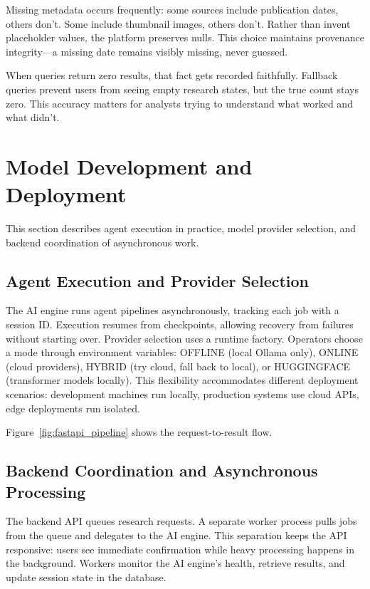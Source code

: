 \documentclass[12pt, a4paper]{article}
\begin{document}
Missing metadata occurs frequently: some sources include publication dates, others don't. Some include thumbnail images, others don't. Rather than invent placeholder values, the platform preserves nulls. This choice maintains provenance integrity—a missing date remains visibly missing, never guessed.

When queries return zero results, that fact gets recorded faithfully. Fallback queries prevent users from seeing empty research states, but the true count stays zero. This accuracy matters for analysts trying to understand what worked and what didn't.

\section{Model Development and Deployment}

This section describes agent execution in practice, model provider selection, and backend coordination of asynchronous work.

\subsection{Agent Execution and Provider Selection}

The AI engine runs agent pipelines asynchronously, tracking each job with a session ID. Execution resumes from checkpoints, allowing recovery from failures without starting over. Provider selection uses a runtime factory. Operators choose a mode through environment variables: OFFLINE (local Ollama only), ONLINE (cloud providers), HYBRID (try cloud, fall back to local), or HUGGINGFACE (transformer models locally). This flexibility accommodates different deployment scenarios: development machines run locally, production systems use cloud APIs, edge deployments run isolated.

Figure~\ref{fig:fastapi_pipeline} shows the request-to-result flow.

\subsection{Backend Coordination and Asynchronous Processing}

The backend API queues research requests. A separate worker process pulls jobs from the queue and delegates to the AI engine. This separation keeps the API responsive: users see immediate confirmation while heavy processing happens in the background. Workers monitor the AI engine's health, retrieve results, and update session state in the database.
\end{document}
